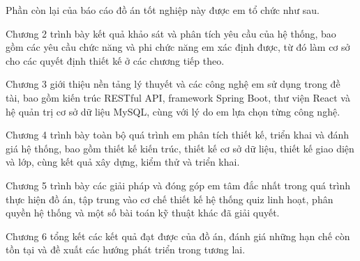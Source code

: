\documentclass[../DoAn.tex]{subfiles}
\begin{document}
Phần còn lại của báo cáo đồ án tốt nghiệp này được em tổ chức như sau.

Chương 2 trình bày kết quả khảo sát và phân tích yêu cầu của hệ thống, bao gồm các yêu cầu chức năng và phi chức năng em xác định được, từ đó làm cơ sở cho các quyết định thiết kế ở các chương tiếp theo.

Chương 3 giới thiệu nền tảng lý thuyết và các công nghệ em sử dụng trong đề tài, bao gồm kiến trúc RESTful API, framework Spring Boot, thư viện React và hệ quản trị cơ sở dữ liệu MySQL, cùng với lý do em lựa chọn từng công nghệ.

Chương 4 trình bày toàn bộ quá trình em phân tích thiết kế, triển khai và đánh giá hệ thống, bao gồm thiết kế kiến trúc, thiết kế cơ sở dữ liệu, thiết kế giao diện và lớp, cùng kết quả xây dựng, kiểm thử và triển khai.

Chương 5 trình bày các giải pháp và đóng góp em tâm đắc nhất trong quá trình thực hiện đồ án, tập trung vào cơ chế thiết kế hệ thống quiz linh hoạt, phân quyền hệ thống và một số bài toán kỹ thuật khác đã giải quyết.

Chương 6 tổng kết các kết quả đạt được của đồ án, đánh giá những hạn chế còn tồn tại và đề xuất các hướng phát triển trong tương lai.
\end{document}
